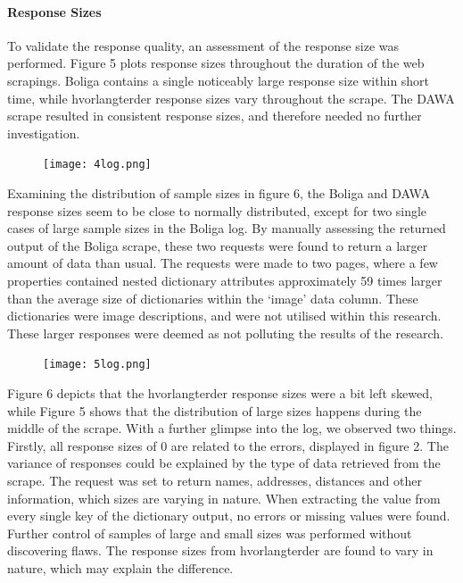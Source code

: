 \documentclass[12pt,a4paper]{article}
\begin{document}
\paragraph{Response Sizes\newline}
To validate the response quality, an assessment of the response size was performed. Figure 5 plots response sizes throughout the duration of the web scrapings. Boliga contains a single noticeably large response size within short time, while hvorlangterder response sizes vary throughout the scrape. The DAWA scrape resulted in consistent response sizes, and therefore needed no further investigation. 
\begin{figure}[H]
  \centering
   \caption{}
   \texttt{[image: 4log.png]} 
  \label{fig:}
\end{figure}
Examining the distribution of sample sizes in figure 6, the Boliga and DAWA response sizes seem to be close to normally distributed, except for two single cases of large sample sizes in the Boliga log. By manually assessing the returned output of the Boliga scrape, these two requests were found to return a larger amount of data than usual. The requests were made to two pages, where a few properties contained nested dictionary attributes approximately 59 times larger than the average size of dictionaries within the ‘image’ data column. These dictionaries were image descriptions, and were not utilised within this research. These larger responses were deemed as not polluting the results of the research.
\begin{figure}[H]
  \centering
   \caption{}
   \texttt{[image: 5log.png]} 
  \label{fig:}
\end{figure}
Figure 6 depicts that the hvorlangterder response sizes were a bit left skewed, while Figure 5 shows that the distribution of large sizes happens during the middle of the scrape. With a further glimpse into the log, we observed two things. Firstly, all response sizes of 0 are related to the errors, displayed in figure 2. The variance of responses could be explained by the type of data retrieved from the scrape. The request was set to return names, addresses, distances and other information, which sizes are varying in nature. When extracting the value from every single key of the dictionary output, no errors or missing values were found. Further control of samples of large and small sizes was performed without discovering flaws. The response sizes from hvorlangterder are found to vary in nature, which may explain the difference.  
\end{document}
